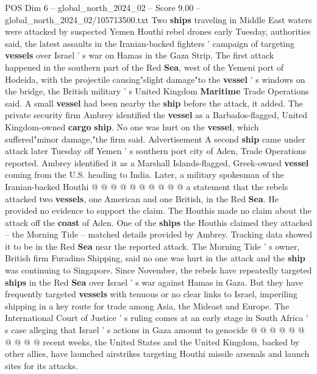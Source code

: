 \begin{textsample}{POS Dim 6 – global\_north\_2024\_02 – Score 9.00 – global\_north\_2024\_02/105713500.txt}  \label{ex:f6_pos_172}
Two \textbf{ships} traveling in Middle East waters were attacked by suspected Yemen Houthi rebel drones early Tuesday, authorities said, the latest assaults in the Iranian-backed fighters ' campaign of targeting \textbf{vessels} over Israel ' s war on Hamas in the Gaza Strip.
The first attack happened in the southern part of the Red \textbf{Sea}, west of the Yemeni port of Hodeida, with the projectile causing"slight damage"to the \textbf{vessel} ' s windows on the bridge, the British military ' s United Kingdom \textbf{Maritime} Trade Operations said.
A small \textbf{vessel} had been nearby the \textbf{ship} before the attack, it added.
The private security firm Ambrey identified the \textbf{vessel} as a Barbados-flagged, United Kingdom-owned \textbf{cargo} \textbf{ship}.
No one was hurt on the \textbf{vessel}, which suffered"minor damage,"the firm said.
Advertisement A second \textbf{ship} came under attack later Tuesday off Yemen ' s southern port city of Aden, Trade Operations reported.
Ambrey identified it as a Marshall Islands-flagged, Greek-owned \textbf{vessel} coming from the U.S. heading to India.
Later, a military spokesman of the Iranian-backed Houthi @ @ @ @ @ @ @ @ @ @ a statement that the rebels attacked two \textbf{vessels}, one American and one British, in the Red \textbf{Sea}.
He provided no evidence to support the claim.
The Houthis made no claim about the attack off the \textbf{coast} of Aden.
One of the \textbf{ships} the Houthis claimed they attacked -- the Morning Tide -- matched details provided by Ambrey.
Tracking data showed it to be in the Red \textbf{Sea} near the reported attack.
The Morning Tide ' s owner, British firm Furadino Shipping, said no one was hurt in the attack and the \textbf{ship} was continuing to Singapore.
Since November, the rebels have repeatedly targeted \textbf{ships} in the Red \textbf{Sea} over Israel ' s war against Hamas in Gaza.
But they have frequently targeted \textbf{vessels} with tenuous or no clear links to Israel, imperiling shipping in a key route for trade among Asia, the Mideast and Europe.
The International Court of Justice ' s ruling comes at an early stage in South Africa ' s case alleging that Israel ' s actions in Gaza amount to genocide @ @ @ @ @ @ @ @ @ @ recent weeks, the United States and the United Kingdom, backed by other allies, have launched airstrikes targeting Houthi missile arsenals and launch sites for its attacks.

\end{textsample}
